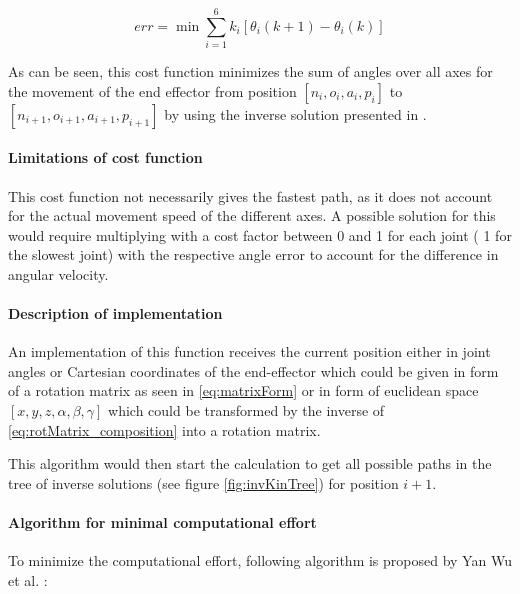\begin{equation}\label{eq:costFuncinvOptim}
	err =  \min\sum_{i=1}^{6} k_i [\theta_i (k+1) - \theta_i(k)] 
\end{equation}

As can be seen, this cost function minimizes the sum of angles over all axes for the movement of the end effector from position $[n_i,o_i,a_i,p_i ]$ to $[n_{i+1}, o_{i+1}, a_{i+1}, p_{i+1}]$ by using the inverse solution presented in .

\paragraph{Limitations of cost function}
This cost function not necessarily gives the fastest path, as it does not account for the actual movement speed of the different axes. 
A possible solution for this would require multiplying with a cost factor between 0 and 1 for each joint ( 1 for the slowest joint) with the respective angle error to account for the difference in angular velocity.



\paragraph{Description of implementation}

An implementation of this function receives the current position either in joint angles or Cartesian coordinates of the end-effector which could be given in form of a rotation matrix as seen in \ref{eq:matrixForm} or in form of euclidean space $[x,y,z, \alpha, \beta, \gamma]$ which could be transformed by the inverse of \ref{eq:rotMatrix_composition} into a rotation matrix.

This algorithm would then start the calculation to get all possible paths in the tree of inverse solutions (see figure \ref{fig:invKinTree}) for position ${i+1}$.

\paragraph{Algorithm for minimal computational effort}

To minimize the computational effort, following algorithm is proposed by Yan Wu et al. \cite{invKinSolYanWu}:

